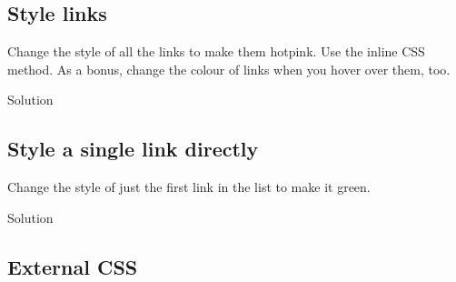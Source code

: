 \documentclass[
]{book}
\newenvironment{Shaded}{\begin{snugshade}}{\end{snugshade}}
\newcommand{\AttributeTok}[1]{\textcolor[rgb]{0.77,0.63,0.00}{#1}}
\newcommand{\FunctionTok}[1]{\textcolor[rgb]{0.00,0.00,0.00}{#1}}
\newcommand{\NormalTok}[1]{#1}
\newcommand{\SpecialCharTok}[1]{\textcolor[rgb]{0.00,0.00,0.00}{#1}}
\newcommand{\StringTok}[1]{\textcolor[rgb]{0.31,0.60,0.02}{#1}}
\begin{document}
\hypertarget{style-links}{%
\subsection{Style links}\label{style-links}}

Change the style of all the links to make them hotpink. Use the inline CSS method. As a bonus, change the colour of links when you hover over them, too.

Solution

\begin{Shaded}
\end{Shaded}

\hypertarget{style-a-single-link-directly}{%
\subsection{Style a single link directly}\label{style-a-single-link-directly}}

Change the style of just the first link in the list to make it green.

Solution

\begin{Shaded}
\end{Shaded}

\hypertarget{external-css-1}{%
\subsection{External CSS}\label{external-css-1}}
\end{document}
